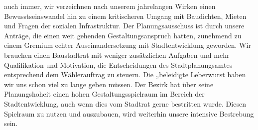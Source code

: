 \documentclass[a4paper,10pt]{article}
\begin{document}
auch immer, wir verzeichnen nach unserem jahrelangen Wirken einen
Bewusstseinswandel hin zu einem kritischeren Umgang mit Baudichten,
Mieten und Fragen der sozialen Infrastruktur. Der Planungsausschuss ist
durch unsere Anträge, die einen weit gehenden Gestaltungsanspruch
hatten, zunehmend zu einem Gremium echter Auseinandersetzung mit
Stadtentwicklung geworden. Wir brauchen einen Baustadtrat mit weniger
zusätzlichen Aufgaben und mehr Qualifikation und Motivation, die
Entscheidungen des Stadtplanungsamtes entsprechend dem Wählerauftrag zu
steuern. Die „beleidigte Leberwurst{\grqq} haben wir uns schon viel zu lange
geben müssen. Der Bezirk hat über seine Planungshoheit einen hohen
Gestaltungsspielraum im Bereich der Stadtentwicklung, auch wenn dies vom
Stadtrat gerne bestritten wurde. Diesen Spielraum zu nutzen und
auszubauen, wird weiterhin unsere intensive Bestrebung sein.

\subsection*{}
\end{document}
